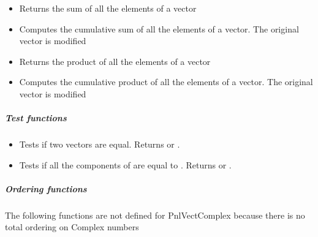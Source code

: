 \begin{itemize}
\item {}
  \sshortdescribe Returns the sum of all the elements of a vector  

\item {}
  \sshortdescribe Computes the cumulative sum of all the elements of a
  vector. The original vector is modified

\item {}
  \sshortdescribe Returns the product of all the elements of a vector  

\item {}
  \sshortdescribe Computes the cumulative product of all the elements of a
  vector. The original vector is modified
\end{itemize}

\subparagraph{Test functions}

\begin{itemize}
\item {}
  \sshortdescribe Tests if two vectors are equal. Returns  or
  .
\item {}
  \sshortdescribe Tests if all the components of  are equal to
  . Returns  or .
\end{itemize}

\subparagraph{Ordering functions}
The following functions are not defined for PnlVectComplex because there is
no total ordering on Complex numbers


